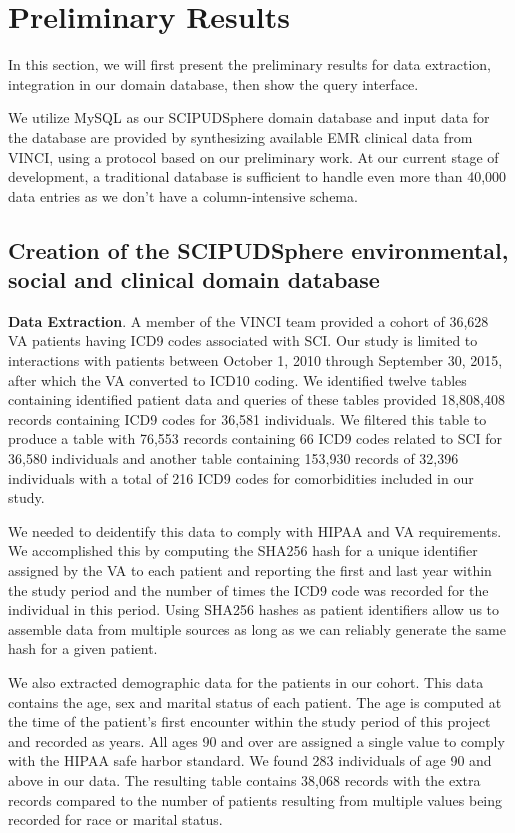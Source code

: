 \documentclass{amia}
\begin{document}
\section{Preliminary Results}
In this section, we will first present the preliminary results for data extraction, integration in our domain database, then show the query interface. 

We utilize MySQL as our SCIPUDSphere domain database and input data for the database are provided by synthesizing available EMR clinical data from VINCI, using a protocol based on our preliminary work. At our current stage of development, a traditional database is sufficient to handle even more than 40,000 data entries as we don't have a column-intensive schema.

\subsection{Creation of the SCIPUDSphere environmental, social and clinical domain database}
{\bf Data Extraction}. A member of the VINCI team provided a cohort of 36,628 VA patients having ICD9 codes associated with SCI. Our study is limited to interactions with patients between October 1, 2010 through September 30, 2015, after which the VA converted to ICD10 coding. We identified twelve tables containing identified patient data and queries of these tables provided 18,808,408 records containing ICD9 codes for 36,581 individuals.  We filtered this table to produce a table with 76,553 records containing 66 ICD9 codes related to SCI for 36,580 individuals and another table containing 153,930 records of 32,396 individuals with a total of 216 ICD9 codes for comorbidities included in our study.

We needed to deidentify this data to comply with HIPAA and VA requirements. We accomplished this by computing the SHA256 hash for a unique identifier assigned by the VA to each patient and reporting the first and last year within the study period and the number of times the ICD9 code was recorded for the individual in this period.  Using SHA256 hashes as patient identifiers allow us to assemble data from multiple sources as long as we can reliably generate the same hash for a given patient.

We also extracted demographic data for the patients in our cohort.  This data contains the age, sex and marital status of each patient. The age is computed at the time of the patient's first encounter within the study period of this project and recorded as years. All ages 90 and over are assigned a single value to comply with the HIPAA safe harbor standard.  We found 283 individuals of age 90 and above in our data. The resulting table contains 38,068 records with the extra records compared to the number of patients resulting from multiple values being recorded for race or marital status.
\end{document}
